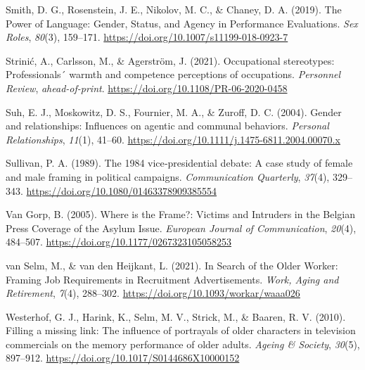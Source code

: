 \documentclass[
  12pt,
  letterpaper,
  DIV=11,
  numbers=noendperiod]{scrartcl}
\newlength{\cslhangindent}
\newlength{\cslentryspacingunit} %
\newenvironment{CSLReferences}[2] %
 {%
  \setlength{\parindent}{0pt}
  \ifodd #1
  \let\oldpar\par
  \def\par{\hangindent=\cslhangindent\oldpar}
  \fi
  \setlength{\parskip}{#2\cslentryspacingunit}
 }%
 {}
\begin{document}
\begin{CSLReferences}{1}{0}
\leavevmode{}%
Smith, D. G., Rosenstein, J. E., Nikolov, M. C., \& Chaney, D. A.
(2019). The {Power} of {Language}: {Gender}, {Status}, and {Agency} in
{Performance Evaluations}. \emph{Sex Roles}, \emph{80}(3), 159--171.
\url{https://doi.org/10.1007/s11199-018-0923-7}

\leavevmode{}%
Strinić, A., Carlsson, M., \& Agerström, J. (2021). Occupational
stereotypes: Professionals´ warmth and competence perceptions of
occupations. \emph{Personnel Review}, \emph{ahead-of-print}.
\url{https://doi.org/10.1108/PR-06-2020-0458}

\leavevmode{}%
Suh, E. J., Moskowitz, D. S., Fournier, M. A., \& Zuroff, D. C. (2004).
Gender and relationships: {Influences} on agentic and communal
behaviors. \emph{Personal Relationships}, \emph{11}(1), 41--60.
\url{https://doi.org/10.1111/j.1475-6811.2004.00070.x}

\leavevmode{}%
Sullivan, P. A. (1989). The 1984 vice‐presidential debate: {A} case
study of female and male framing in political campaigns.
\emph{Communication Quarterly}, \emph{37}(4), 329--343.
\url{https://doi.org/10.1080/01463378909385554}

\leavevmode{}%
Van Gorp, B. (2005). Where is the {Frame}?: {Victims} and {Intruders} in
the {Belgian Press Coverage} of the {Asylum Issue}. \emph{European
Journal of Communication}, \emph{20}(4), 484--507.
\url{https://doi.org/10.1177/0267323105058253}

\leavevmode{}%
van Selm, M., \& van den Heijkant, L. (2021). In {Search} of the {Older
Worker}: {Framing Job Requirements} in {Recruitment Advertisements}.
\emph{Work, Aging and Retirement}, \emph{7}(4), 288--302.
\url{https://doi.org/10.1093/workar/waaa026}

\leavevmode{}%
Westerhof, G. J., Harink, K., Selm, M. V., Strick, M., \& Baaren, R. V.
(2010). Filling a missing link: The influence of portrayals of older
characters in television commercials on the memory performance of older
adults. \emph{Ageing \& Society}, \emph{30}(5), 897--912.
\url{https://doi.org/10.1017/S0144686X10000152}


\end{CSLReferences}
\end{document}
